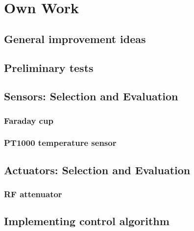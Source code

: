 \chapter{Own Work}
\section{General improvement ideas}
\section{Preliminary tests}
\section{Sensors: Selection and Evaluation}
\subsection{Faraday cup}
\subsection{PT1000 temperature sensor}
\section{Actuators: Selection and Evaluation}
\subsection{RF attenuator}
\section{Implementing control algorithm}
